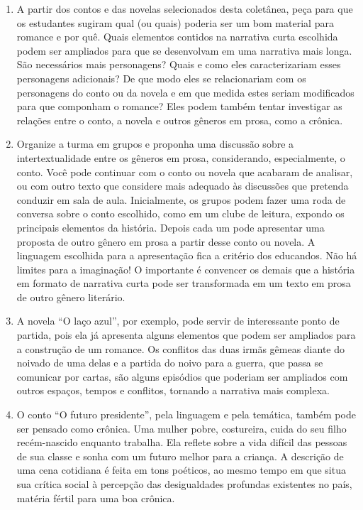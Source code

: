 \documentclass[12pt]{extarticle}
\begin{document}
\begin{enumerate}
\item
A partir dos contos e das novelas selecionados
desta coletânea, peça para que os estudantes sugiram qual (ou quais)
poderia ser um bom material para romance e por quê. Quais elementos
contidos na narrativa curta escolhida podem ser ampliados para que se
desenvolvam em uma narrativa mais longa. São necessários mais
personagens? Quais e como eles caracterizariam esses personagens
adicionais? De que modo eles se relacionariam com os personagens do
conto ou da novela e em que medida estes seriam modificados para que
componham o romance? Eles podem também tentar investigar as relações
entre o conto, a novela e outros gêneros em prosa, como a crônica.

\item
Organize a turma em grupos e proponha uma discussão sobre a
intertextualidade entre os gêneros em prosa, considerando,
especialmente, o conto. Você pode continuar com o conto ou novela que
acabaram de analisar, ou com outro texto que considere mais adequado às
discussões que pretenda conduzir em sala de aula. Inicialmente, os
grupos podem fazer uma roda de conversa sobre o conto escolhido, como em
um clube de leitura, expondo os principais elementos da história. Depois
cada um pode apresentar uma proposta de outro gênero em prosa a partir
desse conto ou novela. A linguagem escolhida para a apresentação fica a
critério dos educandos. Não há limites para a imaginação! O importante é
convencer os demais que a história em formato de narrativa curta pode
ser transformada em um texto em prosa de outro gênero literário.

\item
A novela ``O laço azul'', por exemplo, pode servir de interessante
ponto de partida, pois ela já apresenta alguns elementos que podem ser
ampliados para a construção de um romance. Os conflitos das duas irmãs
gêmeas diante do noivado de uma delas e a partida do noivo para a
guerra, que passa se comunicar por cartas, são alguns episódios que
poderiam ser ampliados com outros espaços, tempos e conflitos, tornando a narrativa mais complexa.

\item
O conto ``O futuro presidente'', pela linguagem e pela temática,
também pode ser pensado como crônica. Uma mulher pobre, costureira,
cuida do seu filho recém-nascido enquanto trabalha. Ela reflete sobre a
vida difícil das pessoas de sua classe e sonha com um futuro melhor para
a criança. A descrição de uma cena cotidiana é feita em tons poéticos,
ao mesmo tempo em que situa sua crítica social à percepção das
desigualdades profundas existentes no país, matéria fértil para uma boa
crônica.
\end{enumerate}
\end{document}

